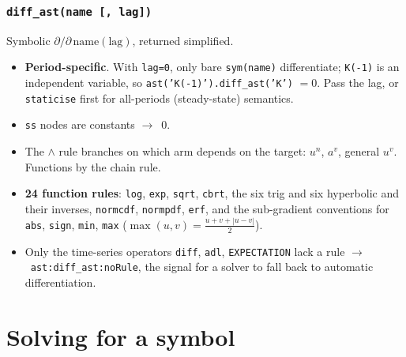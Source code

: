 \documentclass[10pt,slidestop]{beamer}
\newcommand{\code}[1]{\texttt{#1}}
\newcommand{\ra}{$\rightarrow$}
\begin{document}
\begin{frame}\frametitle{\texttt{diff\_ast(name [, lag])}}
  Symbolic $\partial/\partial\,\text{name}(\text{lag})$, returned simplified.

  \begin{itemize}
  \item \textbf{Period-specific}. With \code{lag=0}, only bare \code{sym(name)}
    differentiate; \code{K(-1)} is an independent variable, so
    \code{ast('K(-1)').diff\_ast('K')} $=0$. Pass the lag, or \code{staticise}
    first for all-periods (steady-state) semantics.\newline
  \item \code{ss} nodes are constants \ra\ $0$.\newline
  \item The $\wedge$ rule branches on which arm depends on the target:
    $u^n$, $a^v$, general $u^v$. Functions by the chain rule.\newline
  \item \textbf{24 function rules}: \code{log}, \code{exp}, \code{sqrt},
    \code{cbrt}, the six trig and six hyperbolic and their inverses,
    \code{normcdf}, \code{normpdf}, \code{erf}, and the sub-gradient conventions
    for \code{abs}, \code{sign}, \code{min}, \code{max}
    ($\max(u,v)=\tfrac{u+v+|u-v|}{2}$).\newline
  \item Only the time-series operators \code{diff}, \code{adl},
    \code{EXPECTATION} lack a rule \ra\ \code{ast:diff\_ast:noRule}, the signal
    for a solver to fall back to automatic differentiation.
  \end{itemize}
\end{frame}

\section{Solving for a symbol}
\end{document}
